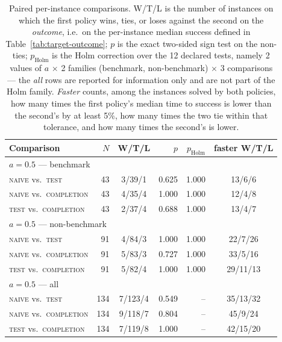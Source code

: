 \begin{table}[t]
\centering
\caption{Paired per-instance comparisons. W/T/L is the number of instances on which the
first policy wins, ties, or loses against the second on the \emph{outcome}, i.e.\ on the
per-instance median success defined in Table~\ref{tab:target-outcome}; $p$ is the exact
two-sided sign test on the non-ties; $p_{\mathrm{Holm}}$ is the Holm correction over the 12
declared tests, namely 2 values of $a$ $\times$ 2 families (benchmark, non-benchmark) $\times$
3 comparisons --- the \emph{all} rows are reported for information only and are not part of the
Holm family. \emph{Faster} counts, among the instances solved by both policies, how many times
the first policy's median time to success is lower than the second's by at least 5\%, how many
times the two tie within that tolerance, and how many times the second's is lower.}
\label{tab:target-paired}
\small
\setlength{\tabcolsep}{5pt}
\begin{tabular}{lrcrrc}
\toprule
Comparison & $N$ & W/T/L & $p$ & $p_{\mathrm{Holm}}$ & faster W/T/L \\
\midrule
\multicolumn{6}{l}{$a=0.5$ --- benchmark} \\
\addlinespace[1pt]
\quad \textsc{naive} vs.\ \textsc{test} & 43 & 3/39/1 & 0.625 & 1.000 & 13/6/6 \\
\quad \textsc{naive} vs.\ \textsc{completion} & 43 & 4/35/4 & 1.000 & 1.000 & 12/4/8 \\
\quad \textsc{test} vs.\ \textsc{completion} & 43 & 2/37/4 & 0.688 & 1.000 & 13/4/7 \\
\midrule
\multicolumn{6}{l}{$a=0.5$ --- non-benchmark} \\
\addlinespace[1pt]
\quad \textsc{naive} vs.\ \textsc{test} & 91 & 4/84/3 & 1.000 & 1.000 & 22/7/26 \\
\quad \textsc{naive} vs.\ \textsc{completion} & 91 & 5/83/3 & 0.727 & 1.000 & 33/5/16 \\
\quad \textsc{test} vs.\ \textsc{completion} & 91 & 5/82/4 & 1.000 & 1.000 & 29/11/13 \\
\midrule
\multicolumn{6}{l}{$a=0.5$ --- all} \\
\addlinespace[1pt]
\quad \textsc{naive} vs.\ \textsc{test} & 134 & 7/123/4 & 0.549 & -- & 35/13/32 \\
\quad \textsc{naive} vs.\ \textsc{completion} & 134 & 9/118/7 & 0.804 & -- & 45/9/24 \\
\quad \textsc{test} vs.\ \textsc{completion} & 134 & 7/119/8 & 1.000 & -- & 42/15/20 \\

\end{tabular}
\end{table}
